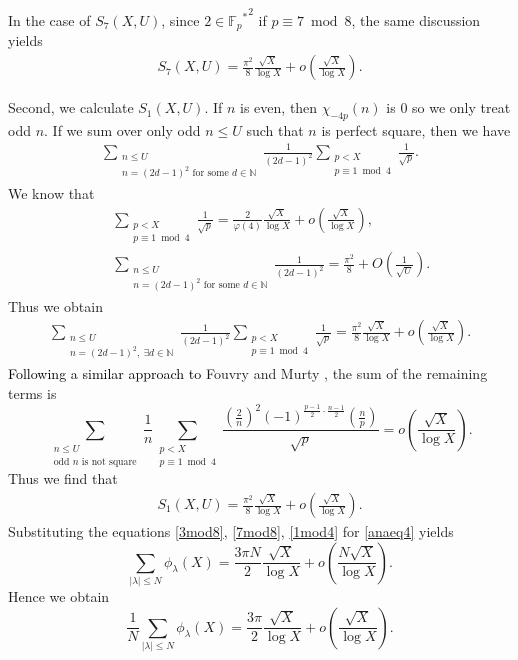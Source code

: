 \documentclass[a4paper, 11pt]{article}
\theoremstyle{plain}
\newcommand{\?}{\textcolor{red}{??}}
\newcommand{\lm}{\lambda}
\newcommand{\fp}{\mathbb{F}_p}
\newcommand{\bN}{\mathbb{N}}
\begin{document}
In the case of $S_7(X,U)$, since $2 \in {{\fp}^{*}}^2$ if $p \equiv 7 \bmod 8$, the same discussion yields
\begin{eqnarray}
\label{7mod8}
    S_7(X,U)=\frac{{\pi}^2}{8} \frac{\sqrt{X}}{\log X} +o \left( \frac{\sqrt{X}}{\log X} \right).
\end{eqnarray}

Second, we calculate $S_1(X,U)$. If $n$ is even, then ${\chi}_{-4p}(n)$ is $0$ so we only treat odd $n$. If we sum over only odd $n \le U$ such that $n$ is perfect square, then we have
  \begin{eqnarray*}
    \sum_{\substack{n \le U \\ n=(2d-1)^2 \text{ for some } d \in \bN }} \frac{1}{(2d-1)^2} \sum_{\substack{p<X \\ p \equiv 1  \bmod 4}} \frac{1}{\sqrt{p}}.
    \end{eqnarray*}
    We know that 
    \begin{eqnarray*}
     && \sum_{\substack{p<X \\ p\equiv 1 \bmod 4}} \frac{1}{\sqrt{p}}=  \frac{2}{\varphi(4)} \frac{\sqrt{X}}{\log X} +o \left( \frac{\sqrt{X}}{\log X} \right),\\
     && \sum_{\substack{n \le U \\ n=(2d-1)^2 \text{ for some } d \in \bN }} \frac{1}{(2d-1)^2}=\frac{{\pi}^2}{8}+O\left( \frac{1}{\sqrt{U}} \right).
    \end{eqnarray*}
    Thus we obtain 
    \begin{eqnarray*}
         \sum_{\substack{n \le U \\ n=(2d-1)^2,\ \exists d \in \bN }} \frac{1}{(2d-1)^2} \sum_{\substack{p<X \\ p \equiv 1 \bmod 4 }} \frac{1}{\sqrt{p}}=\frac{{\pi}^2}{8}\frac{\sqrt{X}}{\log X} +o \left( \frac{\sqrt{X}}{\log X} \right).
    \end{eqnarray*}
\textcolor{black}{Following a similar approach to} Fouvry and Murty \cite[p.92]{FM01}, the sum of the remaining terms is 
\[
\sum_{\substack{n \le U \\ \text{odd }n\text{ is not square}}} \frac{1}{n} \sum_{\substack{p<X \\ p \equiv 1 \bmod 4}}\frac{\left( \frac{2}{n} \right)^2 (-1)^{\frac{p-1}{2} \cdot \frac{n-1}{2}} \left( \frac{n}{p} \right)}{\sqrt{p}} =o \left( \frac{\sqrt{X}}{\log X} \right).
\]
Thus we find that
\begin{eqnarray}
\label{1mod4}
    S_1(X,U)=\frac{{\pi}^2}{8}\frac{\sqrt{X}}{\log X} +o \left( \frac{\sqrt{X}}{\log X} \right).
\end{eqnarray}
Substituting the equations \eqref{3mod8}, \eqref{7mod8}, \eqref{1mod4} for \eqref{anaeq4} yields 
\[
 \sum_{|\lm| \le N} {\phi}_{\lm}(X) =\frac{3\pi N}{2}\frac{\sqrt{X}}{\log X} +o \left( \frac{N \sqrt{X}}{\log X} \right).
\]
Hence we obtain
\[
 \frac{1}{N}\sum_{|\lm| \le N} {\phi}_{\lm}(X) =\frac{3\pi }{2}\frac{\sqrt{X}}{\log X} +o \left( \frac{ \sqrt{X}}{\log X} \right).
\]
\end{document}
